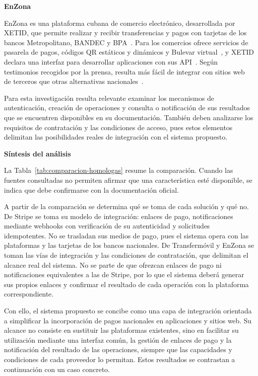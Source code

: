 \documentclass[12pt]{article}
\newcommand\vacio{\leavevmode\par}
\begin{document}
\vacio
\textbf{EnZona}

EnZona es una plataforma cubana de comercio electrónico, desarrollada por XETID, que permite realizar y recibir transferencias y pagos con tarjetas de los bancos Metropolitano, BANDEC y BPA~\cite{xetid}. Para los comercios ofrece servicios de pasarela de pagos, códigos QR estáticos y dinámicos y Bulevar virtual~\cite{granma23}, y XETID declara una interfaz para desarrollar aplicaciones con sus API~\cite{xetid}. Según testimonios recogidos por la prensa, resulta más fácil de integrar con sitios web de terceros que otras alternativas nacionales~\cite{eltoque20}.

Para esta investigación resulta relevante examinar los mecanismos de autenticación, creación de operaciones y consulta o notificación de sus resultados que se encuentren disponibles en su documentación. También deben analizarse los requisitos de contratación y las condiciones de acceso, pues estos elementos delimitan las posibilidades reales de integración con el sistema propuesto.

\vacio
\textbf{Síntesis del análisis}

La Tabla~\ref{tab:comparacion-homologas} resume la comparación. Cuando las fuentes consultadas no permiten afirmar que una característica esté disponible, se indica que debe confirmarse con la documentación oficial.

\vacio
{}

\vacio
A partir de la comparación se determina qué se toma de cada solución y qué no. De Stripe se toma su modelo de integración: enlaces de pago, notificaciones mediante webhooks con verificación de su autenticidad y solicitudes idempotentes. No se trasladan sus medios de pago, pues el sistema opera con las plataformas y las tarjetas de los bancos nacionales. De Transfermóvil y EnZona se toman las vías de integración y las condiciones de contratación, que delimitan el alcance real del sistema. No se parte de que ofrezcan enlaces de pago ni notificaciones equivalentes a las de Stripe, por lo que el sistema deberá generar sus propios enlaces y confirmar el resultado de cada operación con la plataforma correspondiente.

Con ello, el sistema propuesto se concibe como una capa de integración orientada a simplificar la incorporación de pagos nacionales en aplicaciones y sitios web. Su alcance no consiste en sustituir las plataformas existentes, sino en facilitar su utilización mediante una interfaz común, la gestión de enlaces de pago y la notificación del resultado de las operaciones, siempre que las capacidades y condiciones de cada proveedor lo permitan. Estos resultados se contrastan a continuación con un caso concreto.
\end{document}
